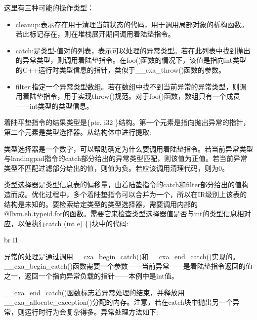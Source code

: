 这里有三种可能的操作类型：

\begin{itemize}
\item
cleanup:表示存在用于清理当前状态的代码，用于调用局部对象的析构函数。若此标记存在，则在堆栈展开期间调用着陆垫指令。

\item
catch:是类型-值对的列表，表示可以处理的异常类型。若在此列表中找到抛出的异常类型，则调用着陆垫指令。在foo()函数的情况下，该值是指向int类型的C++运行时类型信息的指针，类似于\_\_cxa\_throw()函数的参数。

\item
filter:指定一个异常类型数组。若在数组中找不到当前异常的异常类型，则调用着陆垫指令，用于实现throw()规范。对于foo()函数，数组只有一个成员——int类型的类型信息。
\end{itemize}

着陆平垫指令的结果类型是\{ptr, i32 \}结构。第一个元素是指向抛出异常的指针，第二个元素是类型选择器。从结构体中进行提取:

\begin{shell}
\end{shell}

类型选择器是一个数字，可以帮助确定为什么要调用着陆垫指令。若当前异常类型与landingpad指令的catch部分给出的异常类型匹配，则该值为正值。若当前异常类型不匹配过滤部分给出的值，则值为负。若应该调用清理代码，则为0。

类型选择器是类型信息表的偏移量，由着陆垫指令的catch和filter部分给出的值构造而成。优化过程中，多个着陆垫指令可以合并为一个，所以在IR级别上该表的结构是未知的。要检索给定类型的类型选择器，需要调用内部的@llvm.eh.typeid.for的函数。需要它来检查类型选择器值是否与int的类型信息相对应，以便执行catch (int e) \{\}块中的代码:

\begin{shell}
br i1 %
\end{shell}

异常的处理是通过调用\_\_cxa\_begin\_catch()和\_\_cxa\_end\_catch()实现的。\_\_cxa\_begin\_catch()函数需要一个参数——当前异常——是着陆垫指令返回的值之一，返回一个指向异常负载的指针——本例中是int值。

\_\_cxa\_end\_catch()函数标志着异常处理的结束，并释放用\_\_cxa\_allocate\_exception()分配的内存。注意，若在catch块中抛出另一个异常，则运行时行为会复杂得多。异常处理方法如下:

